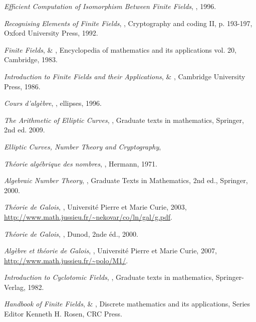 \documentclass[a4paper]{article} %
\numberwithin{section}{part}
\numberwithin{equation}{section}
\begin{document}
\begin{thebibliography}{LC}

 \emph{Efficient Computation of Isomorphism Between Finite Fields},
, 1996.

 \emph{Recognising Elements of Finite Fields}, , Cryptography and coding II, p. 193-197, Oxford University Press, 1992.

 \emph{Finite Fields},  \& 
, Encyclopedia of mathematics and its applications vol.
20, Cambridge, 1983.

 \emph{Introduction to Finite Fields and their Applications},
 \& , Cambridge University Press,
1986.

 \emph{Cours d'algèbre}, , ellipses, 1996.

 \emph{The Arithmetic of Elliptic Curves}, 
, Graduate texts in mathematics, Springer, 2nd ed. 
2009.

 \emph{Elliptic Curves, Number Theory and Cryptography},


 \emph{Théorie algébrique des nombres}, , 
Hermann, 1971.

 \emph{Algebraic Number Theory}, , Graduate Texts
in Mathematics, 2nd ed., Springer, 2000.

 \emph{Théorie de Galois}, , Université 
Pierre et Marie Curie, 2003,  
\url{http://www.math.jussieu.fr/~nekovar/co/ln/gal/g.pdf}.

 \emph{Théorie de Galois}, , Dunod, 2nde
éd., 2000.

 \emph{Algèbre et théorie de Galois}, , 
Université Pierre et Marie Curie, 2007,  
\url{http://www.math.jussieu.fr/~polo/M1/}.

 \emph{Introduction to Cyclotomic Fields}, , Graduate texts in mathematics, Springer-Verlag, 1982.


 \emph{Handbook of Finite Fields},  \& 
, Discrete mathematics and its applications, Series Editor 
Kenneth H. Rosen, CRC Press.


\end{thebibliography}
\end{document}
